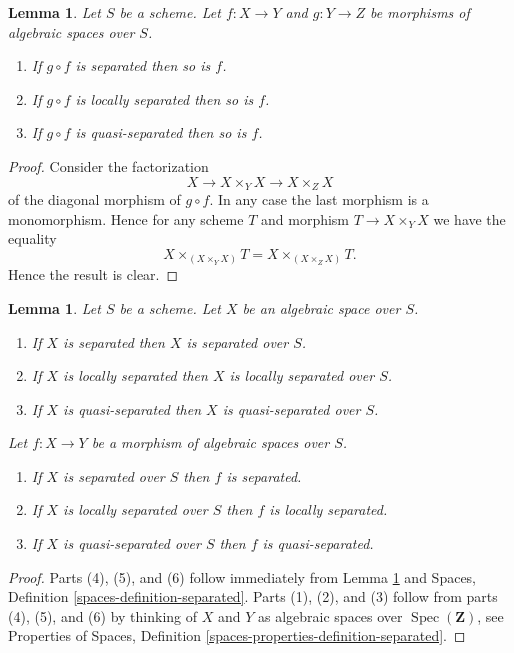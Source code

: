 \documentclass{stacks-project}
\theoremstyle{plain}
\newtheorem{lemma}[subsection]{Lemma}
\theoremstyle{definition}
\theoremstyle{remark}
\numberwithin{equation}{subsection}
\def\Spec{\mathop{\mathrm{Spec}}}
\begin{document}
\begin{lemma}
\label{lemma-compose-after-separated}
Let $S$ be a scheme.
Let $f : X \to Y$ and $g : Y \to Z$ be morphisms of algebraic spaces over $S$.
\begin{enumerate}
\item If $g \circ f$ is separated then so is $f$.
\item If $g \circ f$ is locally separated then so is $f$.
\item If $g \circ f$ is quasi-separated then so is $f$.
\end{enumerate}
\end{lemma}

\begin{proof}
Consider the factorization
$$
X \to X \times_Y X \to X \times_Z X
$$
of the diagonal morphism of $g \circ f$. In any case the last morphism
is a monomorphism. Hence for any scheme $T$ and morphism
$T \to X \times_Y X$ we have the equality
$$
X \times_{(X \times_Y X)} T = X \times_{(X \times_Z X)} T.
$$
Hence the result is clear.
\end{proof}

\begin{lemma}
\label{lemma-separated-implies-morphism-separated}
Let $S$ be a scheme. Let $X$ be an algebraic space over $S$.
\begin{enumerate}
\item If $X$ is separated then $X$ is separated over $S$.
\item If $X$ is locally separated then $X$ is locally separated over $S$.
\item If $X$ is quasi-separated then $X$ is quasi-separated over $S$.
\end{enumerate}
Let $f : X \to Y$ be a morphism of algebraic spaces over $S$.
\begin{enumerate}
\item[(4)] If $X$ is separated over $S$ then $f$ is separated.
\item[(5)] If $X$ is locally separated over $S$ then $f$ is locally separated.
\item[(6)] If $X$ is quasi-separated over $S$ then $f$ is quasi-separated.
\end{enumerate}
\end{lemma}

\begin{proof}
Parts (4), (5), and (6) follow immediately from
Lemma \ref{lemma-compose-after-separated}
and
Spaces, Definition \ref{spaces-definition-separated}.
Parts (1), (2), and (3) follow from parts (4), (5), and (6) by
thinking of $X$ and $Y$ as algebraic spaces over
$\Spec(\mathbf{Z})$, see
Properties of Spaces, Definition \ref{spaces-properties-definition-separated}.
\end{proof}
\end{document}

